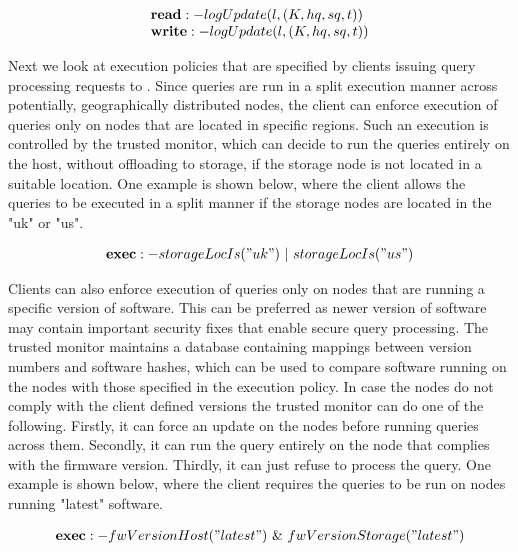 \[
 \begin{array}{@{}l@{}}
 \textbf{read}:-logUpdate (l, (K, hq, sq, t))\\
 \textbf{write}:-logUpdate (l, (K, hq, sq, t))\\
 \end{array}
\]
\fi

Next we look at execution policies that are specified by clients issuing query processing requests to \project{}. Since queries are run in a split execution manner across potentially, geographically distributed nodes, the client can enforce execution of queries only on nodes that are located in specific regions. Such an execution is controlled by the trusted monitor, which can decide to run the queries entirely on the host, without offloading to storage, if the storage node is not located in a suitable location. One example is shown below, where the client allows the queries to be executed in a split manner if the storage nodes are located in the "uk" or "us".

\[
 \begin{array}{@{}l@{}}
 \textbf{exec}:-storageLocIs ("uk") ~ | ~ storageLocIs ("us")\\
 \end{array}
\]

Clients can also enforce execution of queries only on nodes that are running a specific version of software. This can be preferred as newer version of software may contain important security fixes that enable secure query processing. The trusted monitor maintains a database containing mappings between version numbers and software hashes, which can be used to compare software running on the nodes with those specified in the execution policy. In case the nodes do not comply with the client defined versions the trusted monitor can do one of the following. Firstly, it can force an update on the nodes before running queries across them. Secondly, it can run the query entirely on the node that complies with the firmware version. Thirdly, it can just refuse to process the query. One example is shown below, where the client requires the queries to be run on nodes running "latest" software.

\[
 \begin{array}{@{}l@{}}
 \textbf{exec}:-fwVersionHost ("latest") ~ \& ~ fwVersionStorage ("latest")\\
 \end{array}
\]
\fi

